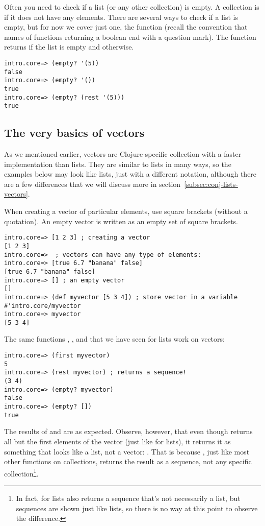 Often you need to check if a list (or any other collection) is empty. A collection is  if it does not have any elements. There are several ways to check if a list is empty, but for now we cover just one, the function  (recall the convention that names of functions returning a boolean end with a question mark). The function returns  if the list is empty and  otherwise.
\begin{framed}
\begin{verbatim}
intro.core=> (empty? '(5))
false
intro.core=> (empty? '())
true
intro.core=> (empty? (rest '(5)))
true
\end{verbatim}
\end{framed}

\subsection{The very basics of vectors}\label{subsec:vectors}
As we mentioned earlier, vectors are Clojure-specific collection with a faster implementation than lists. They are similar to lists in many ways, so the examples below may look like lists, just with a different notation, although there are a few differences that we will discuss more in section~\ref{subsec:conj-lists-vectors}.

When creating a vector of particular elements, use square brackets (without a quotation). An empty vector is written as an empty set of square brackets.
\begin{framed}
\begin{verbatim}
intro.core=> [1 2 3] ; creating a vector
[1 2 3]
intro.core=>  ; vectors can have any type of elements: 
intro.core=> [true 6.7 "banana" false]
[true 6.7 "banana" false]
intro.core=> [] ; an empty vector
[]
intro.core=> (def myvector [5 3 4]) ; store vector in a variable 
#'intro.core/myvector
intro.core=> myvector
[5 3 4]
\end{verbatim}
\end{framed}
The same functions  , , and  that we have seen for lists work on vectors:

\begin{framed}
\begin{verbatim}
intro.core=> (first myvector)
5
intro.core=> (rest myvector) ; returns a sequence!
(3 4)
intro.core=> (empty? myvector)
false
intro.core=> (empty? [])
true
\end{verbatim}
\end{framed}
The results of    and    are as expected. Observe, however, that even though  returns all but the first elements of the vector (just like for lists), it returns it as something that looks like a list, not a vector: . That is because  , just like most other functions on collections, returns the result as a sequence, not any specific collection\footnote{In fact,  for lists also returns a sequence that's not necessarily a list, but sequences are shown just like lists, so there is no way at this point to observe the difference.}. 

